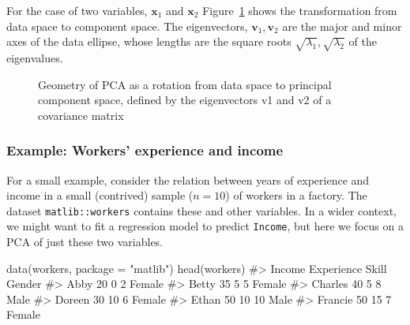 \documentclass[
  letterpaper,
  10pt,
  krantz2]{krantz}
\makeatletter
\newenvironment{Shaded}{\begin{snugshade}}{\end{snugshade}}
\newcommand{\AttributeTok}[1]{\textcolor[rgb]{0.40,0.45,0.13}{#1}}
\newcommand{\CommentTok}[1]{\textcolor[rgb]{0.37,0.37,0.37}{#1}}
\newcommand{\FunctionTok}[1]{\textcolor[rgb]{0.28,0.35,0.67}{#1}}
\newcommand{\NormalTok}[1]{\textcolor[rgb]{0.00,0.23,0.31}{#1}}
\newcommand{\StringTok}[1]{\textcolor[rgb]{0.13,0.47,0.30}{#1}}
\newenvironment{kframe}{%
  \medskip{}
  \setlength{\fboxsep}{.8em}
  \def\at@end@of@kframe{}%
  \ifinner\ifhmode%
  \def\at@end@of@kframe{\end{minipage}}%
  \begin{minipage}{\columnwidth}%
  \fi\fi%
  \def\FrameCommand##1{\hskip\@totalleftmargin \hskip-\fboxsep
  \colorbox{shadecolor}{##1}\hskip-\fboxsep
      \hskip-\linewidth \hskip-\@totalleftmargin \hskip\columnwidth}%
  \MakeFramed {\advance\hsize-\width
    \@totalleftmargin\z@ \linewidth\hsize
    \@setminipage}}%
{\par\unskip\endMakeFramed%
  \at@end@of@kframe}
\renewenvironment{Shaded}{\begin{kframe}}{\end{kframe}}
\makeatother
\begin{document}
For the case of two variables, \(\mathbf{x}_1\) and \(\mathbf{x}_2\)
Figure~\ref{fig-pca-rotation} shows the transformation from data space
to component space. The eigenvectors, \(\mathbf{v}_1, \mathbf{v}_2\) are
the major and minor axes of the data ellipse, whose lengths are the
square roots \(\sqrt{\lambda_1}, \sqrt{\lambda_2}\) of the eigenvalues.

\begin{figure}


\caption{\label{fig-pca-rotation}Geometry of PCA as a rotation from data
space to principal component space, defined by the eigenvectors v1 and
v2 of a covariance matrix}

\end{figure}%

\subsubsection*{Example: Workers' experience and
income}\label{example-workers-experience-and-income}

For a small example, consider the relation between years of experience
and income in a small (contrived) sample (\(n = 10\)) of workers in a
factory. The dataset \texttt{matlib::workers} contains these and other
variables. In a wider context, we might want to fit a regression model
to predict \texttt{Income}, but here we focus on a PCA of just these two
variables.

\begin{Shaded}
\begin{Highlighting}[]
\FunctionTok{data}\NormalTok{(workers, }\AttributeTok{package =} \StringTok{"matlib"}\NormalTok{) }
\FunctionTok{head}\NormalTok{(workers)}
\CommentTok{\#\textgreater{}         Income Experience Skill Gender}
\CommentTok{\#\textgreater{} Abby        20          0     2 Female}
\CommentTok{\#\textgreater{} Betty       35          5     5 Female}
\CommentTok{\#\textgreater{} Charles     40          5     8   Male}
\CommentTok{\#\textgreater{} Doreen      30         10     6 Female}
\CommentTok{\#\textgreater{} Ethan       50         10    10   Male}
\CommentTok{\#\textgreater{} Francie     50         15     7 Female}
\end{Highlighting}
\end{Shaded}
\end{document}
